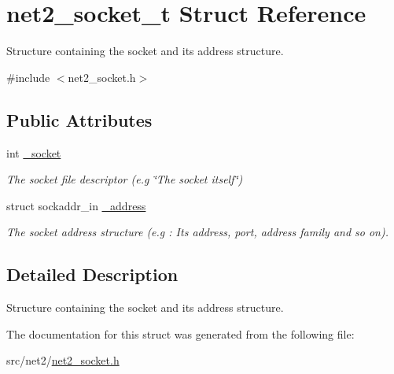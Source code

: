 \hypertarget{structnet2__socket__t}{\section{net2\-\_\-socket\-\_\-t Struct Reference}
\label{structnet2__socket__t}
}


Structure containing the socket and its address structure.  




{\ttfamily \#include $<$net2\-\_\-socket.\-h$>$}

\subsection*{Public Attributes}
\begin{DoxyCompactItemize}
\item 
\hypertarget{structnet2__socket__t_a605421383ca1720f2f46dbc19b4fd101}{int \hyperlink{structnet2__socket__t_a605421383ca1720f2f46dbc19b4fd101}{\-\_\-socket}}\label{structnet2__socket__t_a605421383ca1720f2f46dbc19b4fd101}

\begin{DoxyCompactList}\small\item\em The socket file descriptor (e.\-g \char`\"{}\-The socket itself\char`\"{}) \end{DoxyCompactList}\item 
\hypertarget{structnet2__socket__t_a6527b2540e35955db1187ddee8b75877}{struct sockaddr\-\_\-in \hyperlink{structnet2__socket__t_a6527b2540e35955db1187ddee8b75877}{\-\_\-address}}\label{structnet2__socket__t_a6527b2540e35955db1187ddee8b75877}

\begin{DoxyCompactList}\small\item\em The socket address structure (e.\-g \-: Its address, port, address family and so on). \end{DoxyCompactList}\end{DoxyCompactItemize}


\subsection{Detailed Description}
Structure containing the socket and its address structure. 

The documentation for this struct was generated from the following file\-:\begin{DoxyCompactItemize}
\item 
src/net2/\hyperlink{net2__socket_8h}{net2\-\_\-socket.\-h}\end{DoxyCompactItemize}
